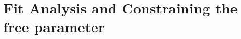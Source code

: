 \documentclass[reprint,%
 amsmath,amssymb,
 aps,
]{revtex4-1}
\begin{document}


  
  
 

 


 








\section{Fit Analysis and Constraining the free parameter \label{sec:analysis}}
 
\end{document}
